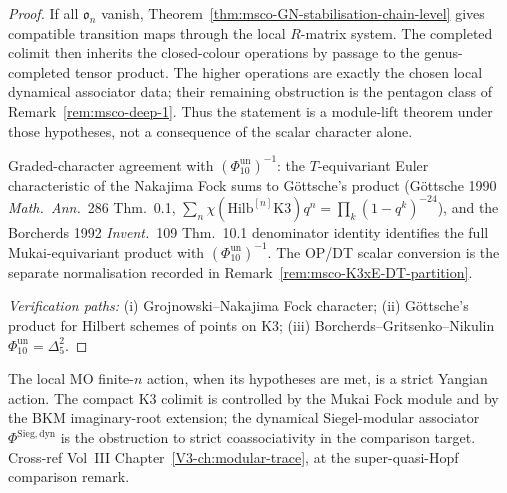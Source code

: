 \begin{proof}
If all $\mathfrak{o}_n$ vanish, Theorem~\ref{thm:msco-GN-stabilisation-chain-level}
gives compatible transition maps through the local $R$-matrix system.
The completed colimit then inherits the closed-colour operations by
passage to the genus-completed tensor product. The higher operations
are exactly the chosen local dynamical associator data; their remaining
obstruction is the pentagon class of
Remark~\ref{rem:msco-deep-1}. Thus the statement is a module-lift
theorem under those hypotheses, not a consequence of the scalar
character alone.

Graded-character agreement with $(\Phi_{10}^{\mathrm{un}})^{-1}$: the $T$-equivariant Euler
characteristic of the Nakajima Fock sums to G\"ottsche's product
(G\"ottsche 1990 \emph{Math.\ Ann.}~286 Thm.~0.1,
$\sum_n\chi(\mathrm{Hilb}^{[n]}\mathrm K3)q^n = \prod_k(1-q^k)^{-24}$),
and the Borcherds 1992 \emph{Invent.}~109 Thm.~10.1 denominator identity
identifies the full Mukai-equivariant product with
$(\Phi_{10}^{\mathrm{un}})^{-1}$. The OP/DT scalar conversion is the
separate normalisation recorded in
Remark~\ref{rem:msco-K3xE-DT-partition}.

\emph{Verification paths:}
(i) Grojnowski--Nakajima Fock character;
(ii) G\"ottsche's product for Hilbert schemes of points on K3;
(iii) Borcherds--Gritsenko--Nikulin
$\Phi_{10}^{\mathrm{un}}=\Delta_5^2$.
\end{proof}

\begin{remark}
\label{rem:msco-BKM-vs-MO-range}
The local MO finite-$n$ action, when its hypotheses are met, is a
strict Yangian action. The compact K3 colimit is controlled by the
Mukai Fock module and by the BKM imaginary-root extension; the dynamical
Siegel-modular associator $\Phi^{\mathrm{Sieg,dyn}}$ is the obstruction
to strict coassociativity in the comparison target. Cross-ref
Vol~III Chapter~\ref{V3-ch:modular-trace}, at the
super-quasi-Hopf comparison remark.
\end{remark}
